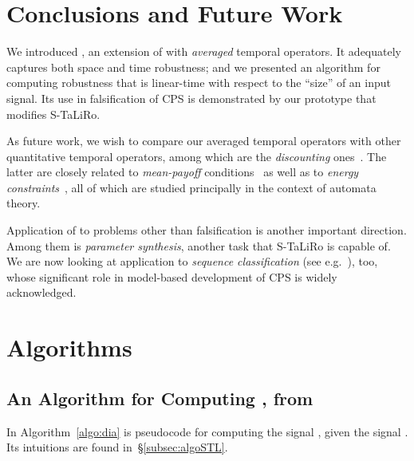 \documentclass[envcountsect,orivec]{llncs} \usepackage{etex} \usepackage[]{graphicx}
\begin{document}
\section{Conclusions and Future Work}
We introduced , an extension of  with \emph{averaged}
temporal
operators. It adequately captures both space and time robustness; and
we presented an algorithm for computing  robustness that is 
linear-time with respect to the ``size'' of an input signal. Its use
in falsification of CPS is demonstrated by our prototype that modifies S-TaLiRo.

As future work, we wish to compare our averaged temporal operators with
other quantitative temporal operators, among which are the
\emph{discounting}
ones~\cite{DBLP:dblp_journals/jacm/AlurFH96,DBLP:conf/tacas/AlmagorBK14}. The
latter are closely related to \emph{mean-payoff}
conditions~\cite{Ehrenfeucht1979, DBLP:conf/lics/ChatterjeeHJ05} as well
as to \emph{energy
constraints}~\cite{DBLP:conf/formats/BouyerFLMS08,DBLP:conf/hybrid/BrenguierCR14},
all of which are studied principally in the context of automata theory.

Application of  to problems other than falsification is another
important direction. Among them is \emph{parameter synthesis}, another
task that S-TaLiRo is capable of.
We are now looking at application to
\emph{sequence classification} (see
e.g.~\cite{DBLP:conf/hybrid/KongJAGB14}), too,
whose significant role in model-based development of CPS is widely acknowledged.






















  


\newpage
\appendix
\section{Algorithms}
\subsection{An  Algorithm for Computing
  , from~\cite{DBLP:conf/cav/DonzeFM13}  }
\label{appendix:algoDia}
In Algorithm~\ref{algo:dia} is pseudocode for 
computing the signal ,
 given the signal .
Its intuitions are found
in~\S{}\ref{subsec:algoSTL}.
\end{document}
